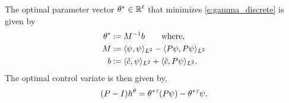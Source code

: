 \begin{proposition}
	\label{t:theta_discrete}
	The optimal parameter vector $\theta^* \in \mathbb{R}^\ell$ that minimizes \eqref{e:gamma_discrete} is given by
	\begin{equation}
	\begin{aligned}
	\param^* & \eqdef M^{-1} b \qquad \text{where,} \\
	M &\eqdef \langle \psi, \psi \rangle_{L^2}- \langle P \psi,  P \psi \rangle_{L^2} \\
	b & \eqdef  \langle \tilc, \psi \rangle_{L^2} +  \langle \tilc, P \psi \rangle_{L^2}.
	\end{aligned}
	\label{e:theta_star_discrete}
	\end{equation}
	The optimal control variate is then given by,
	\[
	(P-I) h^\theta = \theta^{* {\hbox{\tiny\it T}}} (P \psi) - \theta^{* {\hbox{\tiny\it T}}} \psi.
	\]
\end{proposition}
